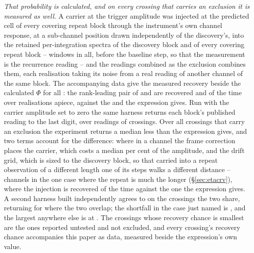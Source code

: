 \emph{That probability is calculated, and on every crossing that carries an
exclusion it is measured as well.} A
carrier at the trigger amplitude was injected at the predicted cell of every
covering repeat block through the instrument's own channel response, at a
sub-channel position drawn independently of the discovery's, into the
retained per-integration spectra of the discovery block and of every covering
repeat block -- \GpNRoleInj{} windows in all, before the baseline step, so
that the measurement is the recurrence reading -- and the readings combined
as the exclusion combines them, each realisation taking its noise
from a real reading of another channel of the same block. The accompanying
data give the measured recovery beside the calculated $\Phi$ for all
\HjNMeas: the rank-leading pair of \EvAStar{} and \EvBStar{} are recovered
\HjMeasSx{} and \HjMeasCp{} of the time over \HjMeasN{} realisations
apiece, against the \RqPowerTrigSx{} and \RqPowerTrigCp{} the expression
gives. Run with the
carrier amplitude set to zero the same harness returns each block's published
reading to the last digit, over \GpNullBlock{} readings of \GpNullStar{}
crossings. Over all \HjNMeas{} crossings that carry an exclusion the
experiment returns a median \HjDevMed{} less than the expression gives, and
two terms account for the difference: where in a channel the frame correction
places the carrier, which costs a median \HjRespMedPct{} per cent of the
amplitude, and the drift grid, which is sized to the discovery block, so that
carried into a repeat observation of a different length one of its steps
walks a different distance -- \HjEtaWalkCh{} channels in the one case where
the repeat is much the longer (\S\ref{sec:etacrv}), where the injection is
recovered \HjEtaMeas{} of the time against the one the expression gives.
A second harness built independently agrees to \HjCrossDev{} on the crossings
the two share, returning \RjMeasCp{} for \EvBStar{} where the two overlap;
the shortfall in the case just named is \HjDevMax, and the largest anywhere
else is \HjDevMaxOther{} at \HjDevStarOther. The \HjNPowerLo{} crossings
whose recovery chance is smallest
are the ones reported untested and not excluded, and every crossing's
recovery chance accompanies this paper as data, measured beside the
expression's own value.

